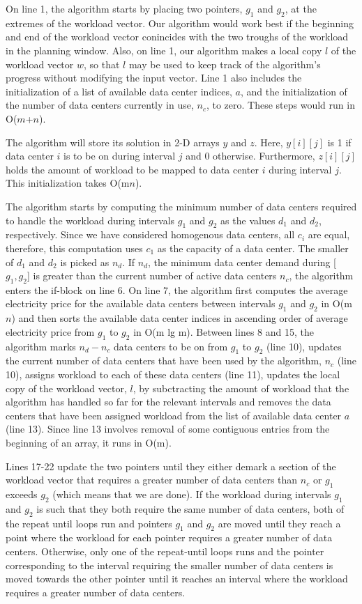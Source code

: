 On line 1, the algorithm starts by placing two pointers, $g_1$ and $g_2$, at the extremes of the workload vector. Our algorithm would work best if the beginning and end of the workload vector conincides with the two troughs of the workload in the planning window. Also, on line 1, our algorithm makes a local copy $l$ of the workload vector $w$, so that $l$ may be used to keep track of the algorithm's progress without modifying the input vector. Line 1 also includes the initialization of a list of available data center indices, $a$, and the initialization of the number of data centers currently in use, $n_c$, to zero. These steps would run in O($m$+$n$).

The algorithm will store its solution in 2-D arrays $y$ and $z$. Here, $y[i][j]$ is 1 if data center $i$ is to be on during interval $j$ and 0 otherwise. Furthermore, $z[i][j]$ holds the amount of workload to be mapped to data center $i$ during interval $j$. This initialization takes O(m$n$).

The algorithm starts by computing the minimum number of data centers required to handle the workload during intervals $g_1$ and $g_2$ as the values $d_1$ and $d_2$, respectively. Since we have considered homogenous data centers, all $c_i$ are equal, therefore, this computation uses $c_1$ as the capacity of a data center. The smaller of $d_1$ and $d_2$ is picked as $n_d$. If $n_d$, the minimum data center demand during [$g_1, g_2$] is greater than the current number of active data centers $n_c$, the algorithm enters the if-block on line 6. On line 7, the algorithm first computes the average electricity price for the available data centers between intervals $g_1$ and $g_2$ in O(m$n$) and then sorts the available data center indices in ascending order of average electricity price from $g_1$ to $g_2$ in O(m lg m). Between lines 8 and 15, the algorithm marks $n_d - n_c$ data centers to be on from $g_1$ to $g_2$ (line 10), updates the current number of data centers that have been used by the algorithm, $n_c$ (line 10), assigns workload to each of these data centers (line 11), updates the local copy of the workload vector, $l$, by subctracting the amount of workload  that the algorithm has handled so far for the relevant intervals and removes the data centers that have been assigned workload from the list of available data center $a$ (line 13). Since line 13 involves removal of some contiguous entries from the beginning of an array, it runs in O(m).

Lines 17-22 update the two pointers until they either demark a section of the workload vector that requires a greater number of data centers than $n_c$ or $g_1$ exceeds $g_2$ (which means that we are done). If the workload during intervals $g_1$ and $g_2$ is such that they both require the same number of data centers, both of the repeat until loops run and pointers $g_1$ and $g_2$ are moved until they reach a point where the workload for each pointer requires a greater number of data centers. Otherwise, only one of the repeat-until loops runs and the pointer corresponding to the interval requiring the smaller number of data centers is moved towards the other pointer until it reaches an interval where the workload requires a greater number of data centers.

